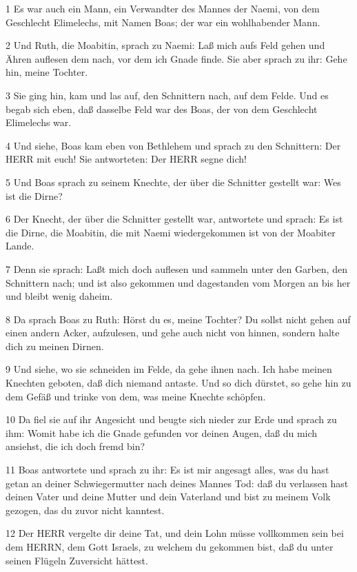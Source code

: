 \par 1 Es war auch ein Mann, ein Verwandter des Mannes der Naemi, von dem Geschlecht Elimelechs, mit Namen Boas; der war ein wohlhabender Mann.
\par 2 Und Ruth, die Moabitin, sprach zu Naemi: Laß mich aufs Feld gehen und Ähren auflesen dem nach, vor dem ich Gnade finde. Sie aber sprach zu ihr: Gehe hin, meine Tochter.
\par 3 Sie ging hin, kam und las auf, den Schnittern nach, auf dem Felde. Und es begab sich eben, daß dasselbe Feld war des Boas, der von dem Geschlecht Elimelechs war.
\par 4 Und siehe, Boas kam eben von Bethlehem und sprach zu den Schnittern: Der HERR mit euch! Sie antworteten: Der HERR segne dich!
\par 5 Und Boas sprach zu seinem Knechte, der über die Schnitter gestellt war: Wes ist die Dirne?
\par 6 Der Knecht, der über die Schnitter gestellt war, antwortete und sprach: Es ist die Dirne, die Moabitin, die mit Naemi wiedergekommen ist von der Moabiter Lande.
\par 7 Denn sie sprach: Laßt mich doch auflesen und sammeln unter den Garben, den Schnittern nach; und ist also gekommen und dagestanden vom Morgen an bis her und bleibt wenig daheim.
\par 8 Da sprach Boas zu Ruth: Hörst du es, meine Tochter? Du sollst nicht gehen auf einen andern Acker, aufzulesen, und gehe auch nicht von hinnen, sondern halte dich zu meinen Dirnen.
\par 9 Und siehe, wo sie schneiden im Felde, da gehe ihnen nach. Ich habe meinen Knechten geboten, daß dich niemand antaste. Und so dich dürstet, so gehe hin zu dem Gefäß und trinke von dem, was meine Knechte schöpfen.
\par 10 Da fiel sie auf ihr Angesicht und beugte sich nieder zur Erde und sprach zu ihm: Womit habe ich die Gnade gefunden vor deinen Augen, daß du mich ansiehst, die ich doch fremd bin?
\par 11 Boas antwortete und sprach zu ihr: Es ist mir angesagt alles, was du hast getan an deiner Schwiegermutter nach deines Mannes Tod: daß du verlassen hast deinen Vater und deine Mutter und dein Vaterland und bist zu meinem Volk gezogen, das du zuvor nicht kanntest.
\par 12 Der HERR vergelte dir deine Tat, und dein Lohn müsse vollkommen sein bei dem HERRN, dem Gott Israels, zu welchem du gekommen bist, daß du unter seinen Flügeln Zuversicht hättest.
